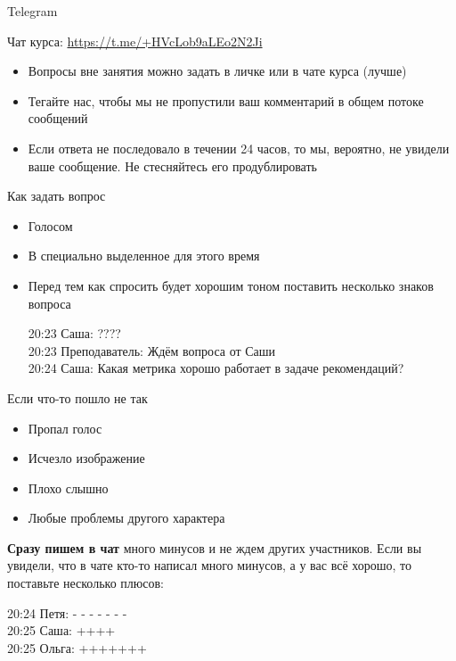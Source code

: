 \documentclass[11pt,aspectratio=169]{beamer}
\begin{document}
\begin{frame}{Telegram}

Чат курса: \url{https://t.me/+HVcLob9aLEo2N2Ji}

\vfill

\begin{itemize}
\item Вопросы вне занятия можно задать в личке или в чате курса (лучше)
\item Тегайте нас, чтобы мы не пропустили ваш комментарий в общем потоке сообщений
\item Если ответа не последовало в течении 24 часов, то мы, вероятно, не увидели ваше сообщение. Не стесняйтесь его продублировать
\end{itemize}

\end{frame}

\begin{frame}{Как задать вопрос}

\begin{itemize}
\item Голосом
\item В специально выделенное для этого время
\item Перед тем как спросить будет хорошим тоном поставить несколько знаков вопроса
\begin{tcolorbox}[colback=gray!5,colframe=gray!80,title=]
20:23 Саша: ???? \\
20:23 Преподаватель: Ждём вопроса от Саши \\
20:24 Саша: Какая метрика хорошо работает в задаче рекомендаций?
\end{tcolorbox}
\end{itemize}

\end{frame}

\begin{frame}{Если что-то пошло не так}

\begin{itemize}
\item Пропал голос
\item Исчезло изображение
\item Плохо слышно
\item Любые проблемы другого характера
\end{itemize}
\vfill
{\bf Сразу пишем в чат} много минусов и не ждем других участников. Если вы увидели, что в чате кто-то написал много минусов, а у вас всё хорошо, то поставьте несколько плюсов:
\vfill
\begin{tcolorbox}[colback=gray!5,colframe=gray!80,title=]
20:24 Петя: - - - - - - -  \\
20:25 Саша: ++++ \\
20:25 Ольга: +++++++
\end{tcolorbox}

\end{frame}
\end{document}
